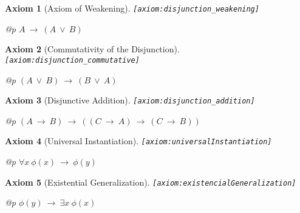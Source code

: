 \documentclass[a4paper,german,10pt,twoside]{book}
\newtheorem{ax}{Axiom}
\theoremstyle{definition}
\theoremstyle{remark}
\begin{document}
\begin{ax}[Axiom of Weakening]
\label{axiom:disjunction_weakening} \hypertarget{axiom:disjunction_weakening}{}
{\tt \tiny [\verb]axiom:disjunction_weakening]]}
\mbox{}
\begin{longtable}{{@{\extracolsep{\fill}}p{\linewidth}}}
\centering $A\ \rightarrow\ (A\ \lor\ B)$
\end{longtable}

\end{ax}


\begin{ax}[Commutativity of the Disjunction]
\label{axiom:disjunction_commutative} \hypertarget{axiom:disjunction_commutative}{}
{\tt \tiny [\verb]axiom:disjunction_commutative]]}
\mbox{}
\begin{longtable}{{@{\extracolsep{\fill}}p{\linewidth}}}
\centering $(A\ \lor\ B)\ \rightarrow\ (B\ \lor\ A)$
\end{longtable}

\end{ax}


\begin{ax}[Disjunctive Addition]
\label{axiom:disjunction_addition} \hypertarget{axiom:disjunction_addition}{}
{\tt \tiny [\verb]axiom:disjunction_addition]]}
\mbox{}
\begin{longtable}{{@{\extracolsep{\fill}}p{\linewidth}}}
\centering $(A\ \rightarrow\ B)\ \rightarrow\ ((C\ \rightarrow\ A)\ \rightarrow\ (C\ \rightarrow\ B))$
\end{longtable}

\end{ax}


\begin{ax}[Universal Instantiation]
\label{axiom:universalInstantiation} \hypertarget{axiom:universalInstantiation}{}
{\tt \tiny [\verb]axiom:universalInstantiation]]}
\mbox{}
\begin{longtable}{{@{\extracolsep{\fill}}p{\linewidth}}}
\centering $\forall x\ \phi(x)\ \rightarrow\ \phi(y)$
\end{longtable}

\end{ax}


\begin{ax}[Existential Generalization]
\label{axiom:existencialGeneralization} \hypertarget{axiom:existencialGeneralization}{}
{\tt \tiny [\verb]axiom:existencialGeneralization]]}
\mbox{}
\begin{longtable}{{@{\extracolsep{\fill}}p{\linewidth}}}
\centering $\phi(y)\ \rightarrow\ \exists x\ \phi(x)$
\end{longtable}

\end{ax}
\end{document}
